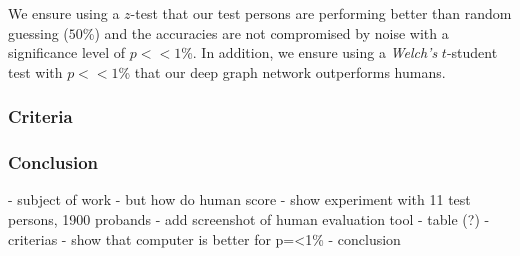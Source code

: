 We ensure using a $z$-test that our test persons are performing better than random guessing ($50$\%) and the accuracies are not compromised by noise with a significance level of $p << 1$\%. In addition, we ensure using a \textit{Welch's} $t$-student test with $p << 1$\% that our deep graph network outperforms humans.

\subsubsection{Criteria}

\subsubsection{Conclusion}



- subject of work
- but how do human score
- show experiment with 11 test persons, 1900 probands 
- add screenshot of human evaluation tool
- table (?)
- criterias
- show that computer is better for p=<1\% 
- conclusion 